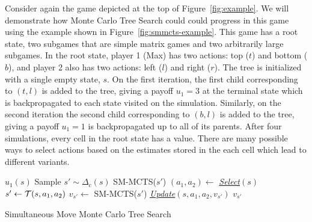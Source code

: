 Consider again the game depicted at the top of Figure~\ref{fig:example}. We will demonstrate how Monte Carlo Tree Search 
could could progress in this game using the example shown in Figure~\ref{fig:smmcts-example}. This game has a root state, 
two subgames that are simple matrix games and two arbitrarily large subgames. In the root state, player 1 (Max) has two 
actions: top ($t$) and bottom ($b$), and player 2 also has two actions: left ($l$) and right ($r$). The tree is initialized 
with a single empty state, $s$. On the first iteration, the first child corresponding to $(t,l)$ is added to the tree, 
giving a payoff $u_1 = 3$ at the terminal state which is backpropagated to each state visited on the simulation. 
Similarly, on the second iteration the second child corresponding to $(b,l)$ is added to the tree, giving a payoff $u_1 = 1$ is 
backpropagated up to all of its parents. 
After four simulations, every cell in the root state has a value. 
There are many possible ways to select actions based on the estimates stored in the each cell which lead to different variants. 

\begin{algorithm2e}[t]
\small
{}
 {
	\Return $u_1(s)$\;
}
 {
        Sample $s' \sim \Delta_c(s)$\;
	\Return SM-MCTS($s'$)\;
}
 {
	$(a_1, a_2) \leftarrow$ \emph{\underline{Select}}$(s)$\;\label{alg:smmcts:select}
	$s' \leftarrow \mathcal{T}(s,a_1,a_2)$\;
	$v_{s'} \leftarrow $ SM-MCTS($s'$)\;\label{alg:smmcts:reccall}
	\emph{\underline{Update}}$(s,a_1,a_2,v_{s'})$\;\label{alg:smmcts:up}
	\Return $v_{s'}$\;
}
\caption{Simultaneous Move Monte Carlo Tree Search}\label{alg:smmcts}
\end{algorithm2e}

